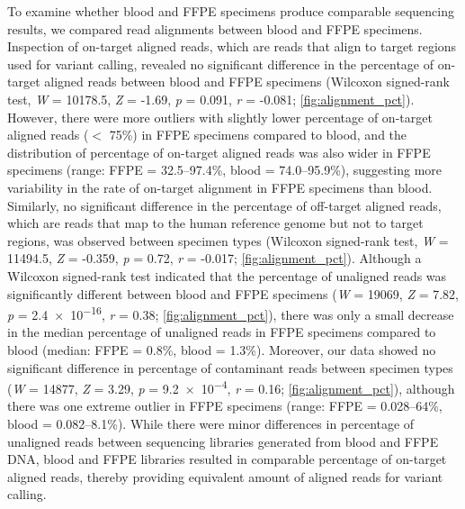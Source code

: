To examine whether blood and FFPE specimens produce comparable sequencing results, we compared read alignments between blood and FFPE specimens. Inspection of on-target aligned reads, which are reads that align to target regions used for variant calling, revealed no significant difference in the percentage of on-target aligned reads between blood and FFPE specimens (Wilcoxon signed-rank test, \textit{W} = \num{10178.5}, \textit{Z} = -1.69, \textit{p} = \num{0.091}, \textit{r} = -0.081; \autoref{fig:alignment_pct}). However, there were more outliers with slightly lower percentage of on-target aligned reads ($<$ 75\%) in FFPE specimens compared to blood, and the distribution of percentage of on-target aligned reads was also wider in FFPE specimens (range: FFPE = 32.5--97.4\%, blood = 74.0--95.9\%), suggesting more variability in the rate of on-target alignment in FFPE specimens than blood. Similarly, no significant difference in the percentage of off-target aligned reads, which are reads that map to the human reference genome but not to target regions, was observed between specimen types (Wilcoxon signed-rank test, \textit{W} = \num{11494.5}, \textit{Z} = -0.359, \textit{p} = \num{0.72}, \textit{r} = -0.017; \autoref{fig:alignment_pct}). Although a Wilcoxon signed-rank test indicated that the percentage of unaligned reads was significantly different between blood and FFPE specimens (\textit{W} = \num{19069}, \textit{Z} = 7.82, \textit{p} = \num{2.4e-16}, \textit{r} = 0.38; \autoref{fig:alignment_pct}), there was only a small decrease in the median percentage of unaligned reads in FFPE specimens compared to blood (median: FFPE = 0.8\%, blood = 1.3\%). Moreover, our data showed no significant difference in percentage of contaminant reads between specimen types (\textit{W} = \num{14877}, \textit{Z} = 3.29, \textit{p} = \num{9.2e-4}, \textit{r} = 0.16; \autoref{fig:alignment_pct}), although there was one extreme outlier in FFPE specimens (range: FFPE = 0.028--64\%, blood = 0.082--8.1\%). While there were minor differences in percentage of unaligned reads between sequencing libraries generated from blood and FFPE DNA, blood and FFPE libraries resulted in comparable percentage of on-target aligned reads, thereby providing equivalent amount of aligned reads for variant calling.

